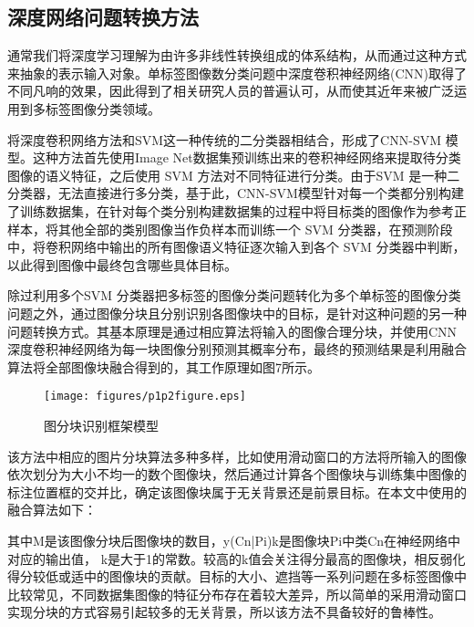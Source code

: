 \subsection{深度网络问题转换方法}

通常我们将深度学习理解为由许多非线性转换组成的体系结构，从而通过这种方式来抽象的表示输入对象。单标签图像数分类问题中深度卷积神经网络(CNN)取得了不同凡响的效果，因此得到了相关研究人员的普遍认可，从而使其近年来被广泛运用到多标签图像分类领域。

将深度卷积网络方法和SVM这一种传统的二分类器相结合，形成了CNN-SVM 模型。这种方法首先使用Image Net数据集预训练出来的卷积神经网络来提取待分类图像的语义特征，之后使用 SVM 方法对不同特征进行分类。由于SVM 是一种二分类器，无法直接进行多分类，基于此，CNN-SVM模型针对每一个类都分别构建了训练数据集，在针对每个类分别构建数据集的过程中将目标类的图像作为参考正样本，将其他全部的类别图像当作负样本而训练一个 SVM 分类器，在预测阶段中，将卷积网络中输出的所有图像语义特征逐次输入到各个 SVM 分类器中判断，以此得到图像中最终包含哪些具体目标。

除过利用多个SVM 分类器把多标签的图像分类问题转化为多个单标签的图像分类问题之外，通过图像分块且分别识别各图像块中的目标，是针对这种问题的另一种问题转换方式。其基本原理是通过相应算法将输入的图像合理分块，并使用CNN深度卷积神经网络为每一块图像分别预测其概率分布，最终的预测结果是利用融合算法将全部图像块融合得到的，其工作原理如图7所示。

\begin{figure}[htbp!]
	\centering
	\texttt{[image: figures/p1p2figure.eps]}
	\caption{图分块识别框架模型}\label{fig:simuP1P2Result}
	\vspace{-1em}
\end{figure}

该方法中相应的图片分块算法多种多样，比如使用滑动窗口的方法将所输入的图像依次划分为大小不均一的数个图像块，然后通过计算各个图像块与训练集中图像的标注位置框的交并比，确定该图像块属于无关背景还是前景目标。在本文中使用的融合算法如下：

其中M是该图像分块后图像块的数目，y(Cn|Pi)k是图像块Pi中类Cn在神经网络中对应的输出值， k是大于1的常数。较高的k值会关注得分最高的图像块，相反弱化得分较低或适中的图像块的贡献。目标的大小、遮挡等一系列问题在多标签图像中比较常见，不同数据集图像的特征分布存在着较大差异，所以简单的采用滑动窗口实现分块的方式容易引起较多的无关背景，所以该方法不具备较好的鲁棒性。


